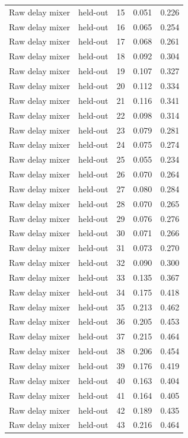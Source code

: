 \begin{tabular}{llrrr}
Raw delay mixer & held-out & 15 & 0.051 & 0.226 \\
Raw delay mixer & held-out & 16 & 0.065 & 0.254 \\
Raw delay mixer & held-out & 17 & 0.068 & 0.261 \\
Raw delay mixer & held-out & 18 & 0.092 & 0.304 \\
Raw delay mixer & held-out & 19 & 0.107 & 0.327 \\
Raw delay mixer & held-out & 20 & 0.112 & 0.334 \\
Raw delay mixer & held-out & 21 & 0.116 & 0.341 \\
Raw delay mixer & held-out & 22 & 0.098 & 0.314 \\
Raw delay mixer & held-out & 23 & 0.079 & 0.281 \\
Raw delay mixer & held-out & 24 & 0.075 & 0.274 \\
Raw delay mixer & held-out & 25 & 0.055 & 0.234 \\
Raw delay mixer & held-out & 26 & 0.070 & 0.264 \\
Raw delay mixer & held-out & 27 & 0.080 & 0.284 \\
Raw delay mixer & held-out & 28 & 0.070 & 0.265 \\
Raw delay mixer & held-out & 29 & 0.076 & 0.276 \\
Raw delay mixer & held-out & 30 & 0.071 & 0.266 \\
Raw delay mixer & held-out & 31 & 0.073 & 0.270 \\
Raw delay mixer & held-out & 32 & 0.090 & 0.300 \\
Raw delay mixer & held-out & 33 & 0.135 & 0.367 \\
Raw delay mixer & held-out & 34 & 0.175 & 0.418 \\
Raw delay mixer & held-out & 35 & 0.213 & 0.462 \\
Raw delay mixer & held-out & 36 & 0.205 & 0.453 \\
Raw delay mixer & held-out & 37 & 0.215 & 0.464 \\
Raw delay mixer & held-out & 38 & 0.206 & 0.454 \\
Raw delay mixer & held-out & 39 & 0.176 & 0.419 \\
Raw delay mixer & held-out & 40 & 0.163 & 0.404 \\
Raw delay mixer & held-out & 41 & 0.164 & 0.405 \\
Raw delay mixer & held-out & 42 & 0.189 & 0.435 \\
Raw delay mixer & held-out & 43 & 0.216 & 0.464 \\

\end{tabular}
